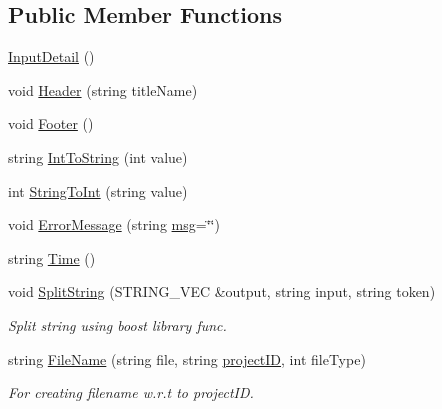 \subsection*{Public Member Functions}
\begin{DoxyCompactItemize}
\item 
\hyperlink{classInputDetail_ab53655b14d922eb32b5d5d06c702e497}{Input\-Detail} ()
\item 
void \hyperlink{classInputDetail_ae55dcc0e15b85d302a09046b145330bb}{Header} (string title\-Name)
\item 
void \hyperlink{classInputDetail_acbc05b1bc6a371cf0a52222cc95e467d}{Footer} ()
\item 
string \hyperlink{classInputDetail_ad0a78d7c864bcccf7813a526d59573be}{Int\-To\-String} (int value)
\item 
int \hyperlink{classInputDetail_aaf532dd61f0aee82b116fef2da8e821f}{String\-To\-Int} (string value)
\item 
void \hyperlink{classInputDetail_a7f1d6cf5e946dadd511c2437b796e5f7}{Error\-Message} (string \hyperlink{classInputDetail_a1abb16cd695678c3fa05e3c812823fee}{msg}=\char`\"{}\char`\"{})
\item 
string \hyperlink{classInputDetail_aaf6caee10a13697ca6dc2bc9aa02e8ab}{Time} ()
\item 
void \hyperlink{classInputDetail_aba635a55313b14cf8bb285560a55498e}{Split\-String} (S\-T\-R\-I\-N\-G\-\_\-\-V\-E\-C \&output, string input, string token)
\begin{DoxyCompactList}\small\item\em Split string using boost library func. \end{DoxyCompactList}\item 
string \hyperlink{classInputDetail_a509ee6dd2de52e87cb764d0b0cceb05a}{File\-Name} (string file, string \hyperlink{classInputDetail_a08069ee622c626c038b821ddcc7427b4}{project\-I\-D}, int file\-Type)
\begin{DoxyCompactList}\small\item\em For creating filename w.\-r.\-t to project\-I\-D. \end{DoxyCompactList}\end{DoxyCompactItemize}
